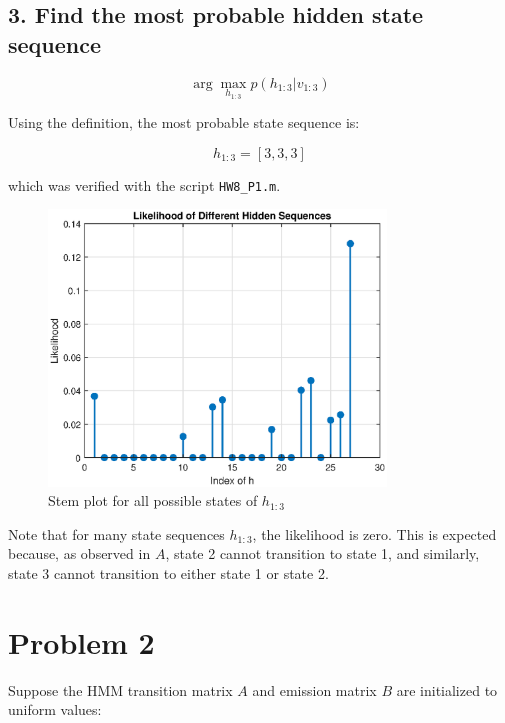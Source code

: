 \documentclass{article}
\begin{document}
\subsection*{3. Find the most probable hidden state sequence}

\[
\arg \max_{h_{1:3}} p(h_{1:3} | v_{1:3})
\]

Using the definition, the most probable state sequence is:

\[
h_{1:3} = [3, 3, 3]
\]

which was verified with the script \texttt{HW8\_P1.m}.


\begin{figure}[H]
    \centering
    \includegraphics[width=0.8\textwidth]{HW8_P1_likelihoods.eps}     
    \caption{Stem plot for all possible states of $h_{1:3}$}
\end{figure}


Note that for many state sequences $h_{1:3}$, the likelihood is zero. This is expected because, as observed in $A$, state 2 cannot transition to state 1, and similarly, state 3 cannot transition to either state 1 or state 2.


\section*{Problem 2}

Suppose the HMM transition matrix \( A \) and emission matrix \( B \) are initialized to uniform values:
\end{document}
